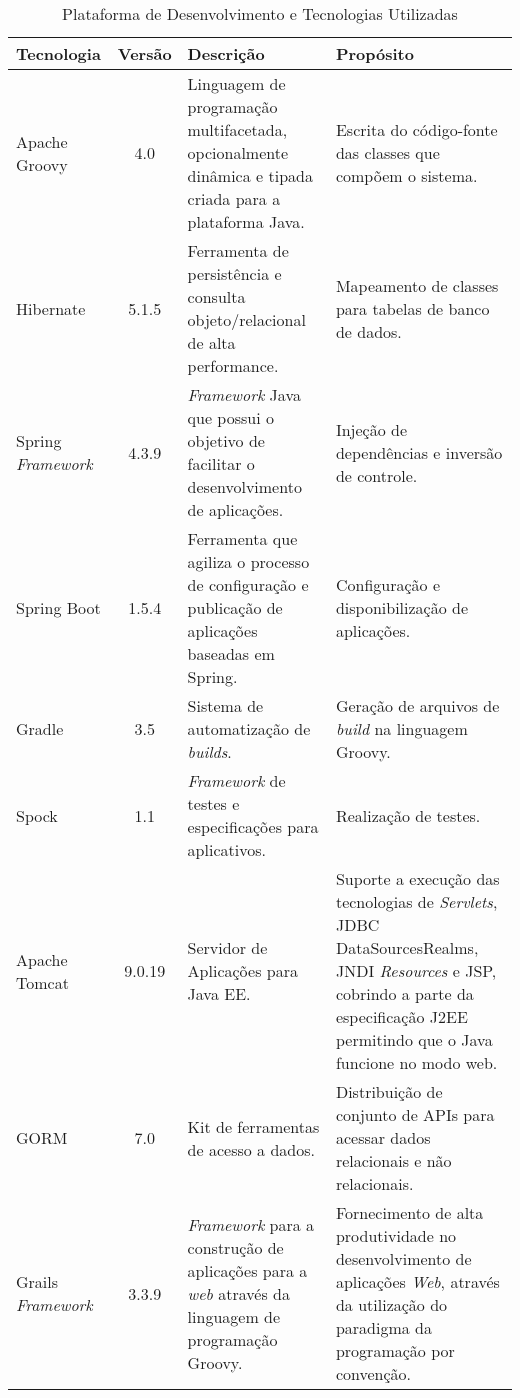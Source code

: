 \begin{table}[h]
	\centering	
	\vspace{0.5cm}
	\footnotesize
	\caption{Plataforma de Desenvolvimento e Tecnologias Utilizadas}	
	\label{tabela-plataforma}
	\begin{tabular}{|p{1.6cm}|c|p{5cm}|p{6.5cm}|}  \hline 
 		
 		\rowcolor[rgb]{0.8,0.8,0.8} Tecnologia & Versão & Descrição & Propósito \\\hline 

		Apache Groovy & 4.0 & Linguagem de programação multifacetada, opcionalmente dinâmica e tipada criada para a plataforma Java. & Escrita do código-fonte das classes que compõem o sistema. \\\hline

		Hibernate & 5.1.5 & Ferramenta de persistência e consulta objeto/relacional de alta performance. & Mapeamento de classes para tabelas de banco de dados. \\\hline 		
		
		Spring \textit{Framework} & 4.3.9 & \textit{Framework} Java que possui o objetivo de facilitar o desenvolvimento de aplicações. & Injeção de dependências e inversão de controle. \\\hline
		
		Spring Boot & 1.5.4 & Ferramenta que agiliza o processo de configuração e publicação de aplicações baseadas em Spring. & Configuração e disponibilização de aplicações. \\\hline
		
		Gradle & 3.5 & Sistema de automatização de \textit{builds}. & Geração de arquivos de \textit{build} na linguagem Groovy. \\\hline
		
		Spock & 1.1 & \textit{Framework} de testes e especificações para aplicativos. & Realização de testes. \\\hline 
	
		Apache Tomcat & 9.0.19 & Servidor de Aplicações para Java EE. & Suporte a execução das tecnologias de \textit{Servlets}, JDBC DataSourcesRealms, JNDI \textit{Resources} e JSP, cobrindo a parte da especificação J2EE permitindo que o Java funcione no modo web. \\\hline
		
		GORM & 7.0 & Kit de ferramentas de acesso a dados. & Distribuição de conjunto de APIs para acessar dados relacionais e não relacionais. \\\hline
		
		Grails \textit{Framework} & 3.3.9 & \textit{Framework} para a construção de aplicações para a \textit{web} através da linguagem de programação Groovy. & Fornecimento de alta produtividade no desenvolvimento de aplicações \textit{Web}, através da utilização do paradigma da programação por convenção.  \\\hline
		
	\end{tabular}
\end{table}






